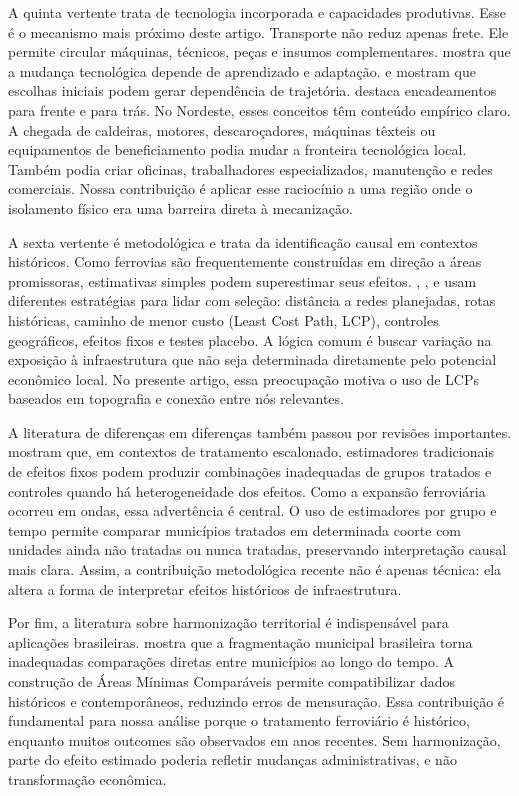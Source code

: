 \documentclass[12pt,a4paper]{article}
\begin{document}
A quinta vertente trata de tecnologia incorporada e capacidades produtivas. Esse é o mecanismo mais próximo deste artigo. Transporte não reduz apenas frete. Ele permite circular máquinas, técnicos, peças e insumos complementares. \citet{rosenberg1982} mostra que a mudança tecnológica depende de aprendizado e adaptação. \citet{david1985} e \citet{arthur1994} mostram que escolhas iniciais podem gerar dependência de trajetória. \citet{hirschman1958} destaca encadeamentos para frente e para trás. No Nordeste, esses conceitos têm conteúdo empírico claro. A chegada de caldeiras, motores, descaroçadores, máquinas têxteis ou equipamentos de beneficiamento podia mudar a fronteira tecnológica local. Também podia criar oficinas, trabalhadores especializados, manutenção e redes comerciais. Nossa contribuição é aplicar esse raciocínio a uma região onde o isolamento físico era uma barreira direta à mecanização.

A sexta vertente é metodológica e trata da identificação causal em contextos históricos. Como ferrovias são frequentemente construídas em direção a áreas promissoras, estimativas simples podem superestimar seus efeitos. \citet{banerjee2012}, \citet{donaldson2018}, \citet{berger2017} e \citet{jedwab2016} usam diferentes estratégias para lidar com seleção: distância a redes planejadas, rotas históricas, caminho de menor custo (Least Cost Path, LCP), controles geográficos, efeitos fixos e testes placebo. A lógica comum é buscar variação na exposição à infraestrutura que não seja determinada diretamente pelo potencial econômico local. No presente artigo, essa preocupação motiva o uso de LCPs baseados em topografia e conexão entre nós relevantes.

A literatura de diferenças em diferenças também passou por revisões importantes. \citet{callaway2021} mostram que, em contextos de tratamento escalonado, estimadores tradicionais de efeitos fixos podem produzir combinações inadequadas de grupos tratados e controles quando há heterogeneidade dos efeitos. Como a expansão ferroviária ocorreu em ondas, essa advertência é central. O uso de estimadores por grupo e tempo permite comparar municípios tratados em determinada coorte com unidades ainda não tratadas ou nunca tratadas, preservando interpretação causal mais clara. Assim, a contribuição metodológica recente não é apenas técnica: ela altera a forma de interpretar efeitos históricos de infraestrutura.

Por fim, a literatura sobre harmonização territorial é indispensável para aplicações brasileiras. \citet{ehrl2017} mostra que a fragmentação municipal brasileira torna inadequadas comparações diretas entre municípios ao longo do tempo. A construção de Áreas Mínimas Comparáveis permite compatibilizar dados históricos e contemporâneos, reduzindo erros de mensuração. Essa contribuição é fundamental para nossa análise porque o tratamento ferroviário é histórico, enquanto muitos outcomes são observados em anos recentes. Sem harmonização, parte do efeito estimado poderia refletir mudanças administrativas, e não transformação econômica.
\end{document}
